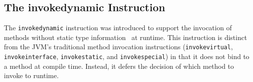 

% 



\subsection{The invokedynamic Instruction}
The \verb|invokedynamic| instruction was introduced to support the invocation of methods without static type information~\cite{noauthor_java_nodate} at runtime.
This instruction is distinct from the JVM's traditional method invocation instructions (\verb|invokevirtual|, \verb|invokeinterface|, \verb|invokestatic|, and \verb|invokespecial|) in that it does not bind to a method at compile time. Instead, it defers the decision of which method to invoke to runtime.

